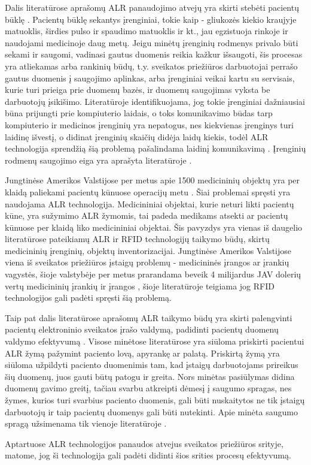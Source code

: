 Dalis literatūrose aprašomų ALR panaudojimo atvejų yra skirti stebėti pacientų būklę \cite{Strommer2006} \cite{Gautam} \cite{Zhang2011}. Pacientų būklę sekantys įrenginiai, tokie kaip - gliukozės kiekio kraujyje matuoklis, širdies pulso ir spaudimo matuoklis ir kt., jau egzistuoja rinkoje ir naudojami medicinoje daug metų. Jeigu minėtų įrenginių rodmenys privalo būti sekami ir saugomi, vadinasi gautus duomenis reikia kažkur išsaugoti, šis procesas yra atliekamas arba rankinių būdų, t.y. sveikatos priežiūros darbuotojai perrašo gautus duomenis į saugojimo aplinkas, arba įrenginiai veikai kartu su servisais, kurie turi prieiga prie duomenų bazės, ir duomenų saugojimas vyksta be darbuotojų įsikišimo. Literatūroje \cite{Strommer2006} identifikuojama, jog tokie įrenginiai dažniausiai būna prijungti prie kompiuterio laidais, o toks komunikavimo būdas tarp kompiuterio ir medicinos įrenginių yra nepatogus, nes kiekvienas įrenginys turi laidinę išvestį, o didinat įrenginių skaičių didėja laidų kiekis, todėl ALR technologija sprendžią šią problemą pašalindama laidinį komunikavimą \cite{Strommer2006}. Įrenginių rodmenų saugojimo eiga yra aprašyta literatūroje \cite{Zhang2011}.

Jungtinėse Amerikos Valstijose per metus apie 1500 medicininių objektų yra per klaidą paliekami pacientų kūnuose operacijų metu \cite{RamaKrishnaPrasad}. Šiai problemai spręsti yra naudojama ALR technologija. Medicininiai objektai, kurie neturi likti pacientų kūne, yra sužymimo ALR žymomis, tai padeda medikams atsekti ar pacientų kūnuose per klaidą liko medicininiai objektai. Šis pavyzdys yra vienas iš daugelio literatūrose \cite{Ajami2014} \cite{Puma2012} \cite{Azlina2013} pateikiamų ALR ir RFID technologijų taikymo būdų, skirtų medicininių įrenginių, objektų inventorizacijai. Jungtinėse Amerikos Valstijose viena iš sveikatos priežiūros įstaigų problemų - medicininės įrangos ar įrankių vagystės, šioje valstybėje per metus prarandama beveik 4 milijardus JAV dolerių vertų medicininių įrankių ir įrangos \cite{RamaKrishnaPrasad}, šioje literatūroje teigiama jog RFID technologijos gali padėti spręsti šią problemą.

Taip pat dalis literatūrose aprašomų ALR taikymo būdų yra skirti palengvinti pacientų elektroninio sveikatos įrašo valdymą, padidinti pacientų duomenų valdymo efektyvumą \cite{Gautam} \cite{RamaKrishnaPrasad} \cite{Fontecha2011} \cite{Davcev2015}. Visose minėtose literatūrose yra siūloma priskirti pacientui ALR žymą pažymint paciento lovą, apyrankę ar palatą. Priskirtą žymą yra siūloma užpildyti paciento duomenimis tam, kad įstaigų darbuotojams prireikus šių duomenų, juos gauti būtų patogu ir greita. Nors minėtas pasiūlymas didina duomenų gavimo greitį, tačiau svarbu atkreipti dėmesį į saugumo spragas, nes žymes, kurios turi svarbius paciento duomenis, gali būti nuskaitytos ne tik įstaigų darbuotojų ir taip pacientų duomenys gali būti nutekinti. Apie minėta saugumo spragą užsimenama tik vienoje literatūroje \cite{RamaKrishnaPrasad}.

Aptartuose ALR technologijos panaudos atvejus sveikatos priežiūros srityje, matome, jog ši technologija gali padėti didinti šios srities procesų efektyvumą.


